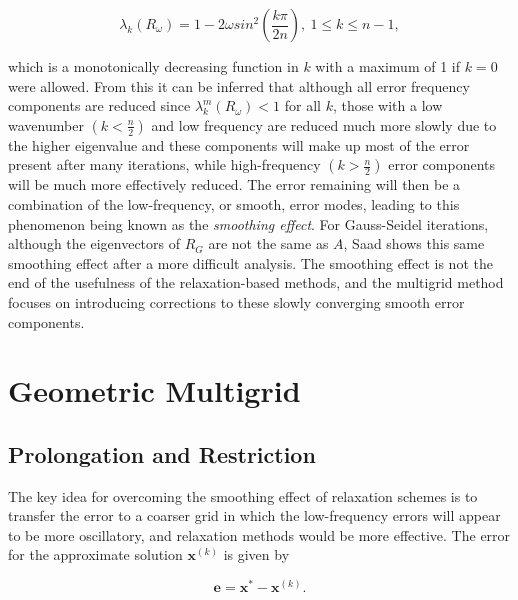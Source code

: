 \begin{equation}
	\lambda_k(R_{\omega}) = 1 - 2\omega sin^2\left(\frac{k\pi}{2n}\right),\ 1 \leq k \leq n-1,
\end{equation}

which is a monotonically decreasing function in $k$ with a maximum of 1 if $k = 0$ were allowed. From this it can be inferred that although all error frequency components are reduced since $\lambda_k^m(R_{\omega}) < 1$ for all $k$, those with a low wavenumber $\left(k < \frac{n}{2}\right)$ and low frequency are reduced much more slowly due to the higher eigenvalue and these components will make up most of the error present after many iterations, while high-frequency $\left(k > \frac{n}{2}\right)$ error components will be much more effectively reduced. The error remaining will then be a combination of the low-frequency, or smooth, error modes, leading to this phenomenon being known as the \emph{smoothing effect}. For Gauss-Seidel iterations, although the eigenvectors of $R_G$ are not the same as $A$, Saad shows this same smoothing effect after a more difficult analysis. The smoothing effect is not the end of the usefulness of the relaxation-based methods, and the multigrid method focuses on introducing corrections to these slowly converging smooth error components.


\section{Geometric Multigrid}

% 

\subsection{Prolongation and Restriction}

The key idea for overcoming the smoothing effect of relaxation schemes is to transfer the error to a coarser grid in which the low-frequency errors will appear to be more oscillatory, and relaxation methods would be more effective. The error for the approximate solution $\mathbf{x}^{(k)}$ is given by

\begin{equation}
	\mathbf{e} = \mathbf{x}^* - \mathbf{x}^{(k)}.
\end{equation}

